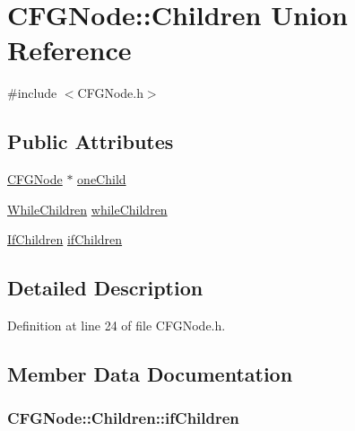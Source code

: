 \hypertarget{union_c_f_g_node_1_1_children}{\section{C\-F\-G\-Node\-:\-:Children Union Reference}
\label{union_c_f_g_node_1_1_children}
}


{\ttfamily \#include $<$C\-F\-G\-Node.\-h$>$}

\subsection*{Public Attributes}
\begin{DoxyCompactItemize}
\item 
\hyperlink{class_c_f_g_node}{C\-F\-G\-Node} $\ast$ \hyperlink{union_c_f_g_node_1_1_children_afc60bae44a853ec41443f1c923860959}{one\-Child}
\item 
\hyperlink{struct_c_f_g_node_1_1_while_children}{While\-Children} \hyperlink{union_c_f_g_node_1_1_children_a2047e28982d12e37280e67961a3e3522}{while\-Children}
\item 
\hyperlink{struct_c_f_g_node_1_1_if_children}{If\-Children} \hyperlink{union_c_f_g_node_1_1_children_a04f6639b330ef30cfaef30c592e15212}{if\-Children}
\end{DoxyCompactItemize}


\subsection{Detailed Description}


Definition at line 24 of file C\-F\-G\-Node.\-h.



\subsection{Member Data Documentation}
\hypertarget{union_c_f_g_node_1_1_children_a04f6639b330ef30cfaef30c592e15212}{
\subsubsection[{if\-Children}]{ C\-F\-G\-Node\-::\-Children\-::if\-Children}}\label{union_c_f_g_node_1_1_children_a04f6639b330ef30cfaef30c592e15212}


